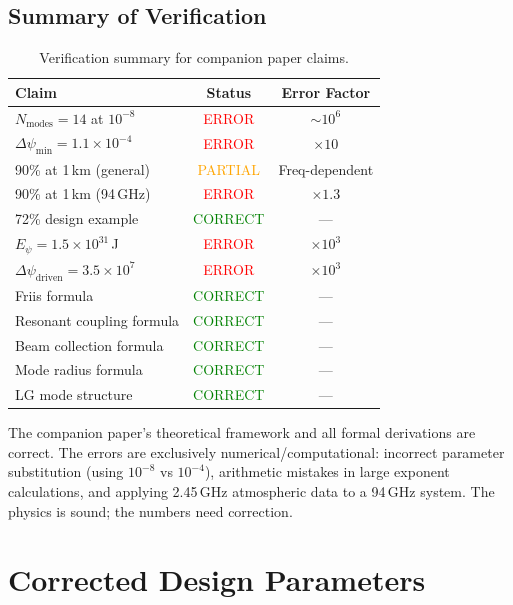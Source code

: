 \documentclass[journal,twocolumn]{IEEEtran}
\begin{document}
\subsection{Summary of Verification}

\begin{table}[h]
\caption{Verification summary for companion paper claims.}
\label{tab:verify}
\centering
\small
\begin{tabular}{lcc}
\toprule
Claim & Status & Error Factor \\
\midrule
$N_\text{modes} = 14$ at $10^{-8}$ & \textcolor{red}{ERROR} & $\sim 10^6$ \\
$\Delta\psi_\text{min} = 1.1\times10^{-4}$ & \textcolor{red}{ERROR} & $\times 10$ \\
90\% at 1\,km (general) & \textcolor{orange}{PARTIAL} & Freq-dependent \\
90\% at 1\,km (94\,GHz) & \textcolor{red}{ERROR} & $\times 1.3$ \\
72\% design example & \textcolor{green}{CORRECT} & --- \\
$E_\psi = 1.5\times10^{31}$\,J & \textcolor{red}{ERROR} & $\times 10^3$ \\
$\Delta\psi_\text{driven} = 3.5\times10^7$ & \textcolor{red}{ERROR} & $\times 10^3$ \\
Friis formula & \textcolor{green}{CORRECT} & --- \\
Resonant coupling formula & \textcolor{green}{CORRECT} & --- \\
Beam collection formula & \textcolor{green}{CORRECT} & --- \\
Mode radius formula & \textcolor{green}{CORRECT} & --- \\
LG mode structure & \textcolor{green}{CORRECT} & --- \\
\bottomrule
\end{tabular}
\end{table}

The companion paper's theoretical framework and all formal derivations
are correct. The errors are exclusively numerical/computational:
incorrect parameter substitution (using $10^{-8}$ vs $10^{-4}$),
arithmetic mistakes in large exponent calculations, and applying
2.45\,GHz atmospheric data to a 94\,GHz system. The physics is sound;
the numbers need correction.

\section{Corrected Design Parameters}\label{sec:corrected}
\end{document}
